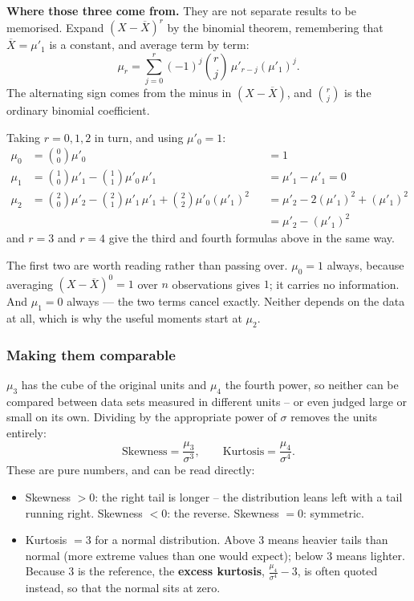 \documentclass[11pt,a4paper]{article}
\theoremstyle{definition}
\begin{document}
\textbf{Where those three come from.} They are not separate results to be memorised. Expand
$(X-\overline{X})^r$ by the binomial theorem, remembering that $\overline{X}=\mu'_1$ is a
constant, and average term by term:
\[\mu_r=\sum_{j=0}^{r}(-1)^j\binom{r}{j}\,\mu'_{r-j}\left(\mu'_1\right)^{j}.\]
The alternating sign comes from the minus in $(X-\overline{X})$, and $\binom{r}{j}$ is the
ordinary binomial coefficient.

Taking $r=0,1,2$ in turn, and using $\mu'_0=1$:
\begin{align*}
\mu_0 &=\binom{0}{0}\mu'_0 &&=1\\[2pt]
\mu_1 &=\binom{1}{0}\mu'_1-\binom{1}{1}\mu'_0\,\mu'_1 &&=\mu'_1-\mu'_1=0\\[2pt]
\mu_2 &=\binom{2}{0}\mu'_2-\binom{2}{1}\mu'_1\,\mu'_1+\binom{2}{2}\mu'_0\left(\mu'_1\right)^2
      &&=\mu'_2-2\left(\mu'_1\right)^2+\left(\mu'_1\right)^2\\
      & &&=\mu'_2-\left(\mu'_1\right)^2
\end{align*}
and $r=3$ and $r=4$ give the third and fourth formulas above in the same way.

The first two are worth reading rather than passing over. $\mu_0=1$ always, because averaging
$(X-\overline{X})^0=1$ over $n$ observations gives $1$; it carries no information. And
$\mu_1=0$ always --- the two terms cancel exactly. Neither depends on the data at all, which
is why the useful moments start at $\mu_2$.

\subsubsection{Making them comparable}

$\mu_3$ has the cube of the original units and $\mu_4$ the fourth power, so neither can be
compared between data sets measured in different units -- or even judged large or small on
its own. Dividing by the appropriate power of $\sigma$ removes the units entirely:
\[\text{Skewness}=\frac{\mu_3}{\sigma^3},\qquad
\text{Kurtosis}=\frac{\mu_4}{\sigma^4}.\]
These are pure numbers, and can be read directly:
\begin{itemize}
\item Skewness $>0$: the right tail is longer -- the distribution leans left with a tail
running right. Skewness $<0$: the reverse. Skewness $=0$: symmetric.
\item Kurtosis $=3$ for a normal distribution. Above 3 means heavier tails than normal
(more extreme values than one would expect); below 3 means lighter. Because 3 is the
reference, the \textbf{excess kurtosis}, $\frac{\mu_4}{\sigma^4}-3$, is often quoted
instead, so that the normal sits at zero.
\end{itemize}
\end{document}
